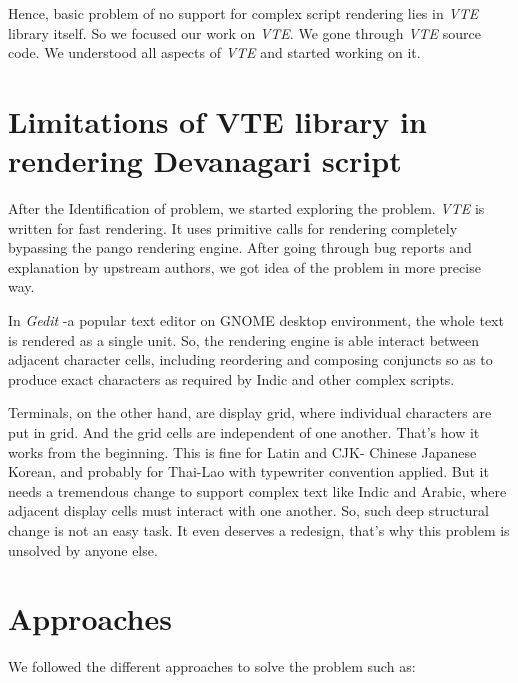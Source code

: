 Hence, basic problem of no support for complex script rendering lies in \textit{VTE} library itself. So we focused our work on \textit{VTE}. We gone through \textit{VTE} source code. We understood all aspects of \textit{VTE} and started working on it.

\section{Limitations of VTE library in rendering Devanagari script}
After the Identification of problem, we started exploring the problem. \textit{VTE} is written for fast rendering. It uses primitive calls for rendering completely bypassing the pango rendering engine. After going through bug reports \cite{bug1} \cite{bug2} and explanation by upstream authors, we got idea of the problem in more precise way. 

In \textit{Gedit} -a popular text editor on GNOME desktop environment, the whole text is rendered as a single unit. So, the rendering engine is able interact between adjacent character cells, including reordering and composing conjuncts so as to produce exact characters as required by Indic and other complex scripts. 

Terminals, on the other hand, are display grid, where individual characters are put in grid. And the grid cells are independent of one another. That's how it works from the beginning. This is fine for Latin and CJK- Chinese Japanese Korean, and probably for Thai-Lao with typewriter convention applied. But it needs a tremendous change to support complex text like Indic and Arabic, where adjacent display cells must interact with one another. So, such deep structural change is not an easy task. It even deserves a redesign, that's why this problem is unsolved by anyone else.


\section{Approaches}
We followed the different approaches to solve the problem such as:

